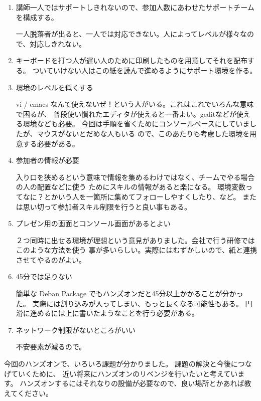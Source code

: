\documentclass[mingoth,a4paper]{jsarticle}
\begin{document}
 \begin{enumerate}
   \item 講師一人ではサポートしきれないので、参加人数にあわせたサポートチームを構成する。

     一人脱落者が出ると、一人では対応できない。人によってレベルが様々なので、対応しきれない。

   \item キーボードを打つ人が遅い人のために印刷したものを用意してそれを配布する。
         ついていけない人はこの紙を読んで進めるようにサポート環境を作る。

   \item  環境のレベルを低くする
    
     vi / emacs なんて使えないぜ！という人がいる。これはこれでいろんな意味で困るが、
     普段使い慣れたエディタが使えると一番よい。geditなどが使える環境なども必要。
     今回は手順を省くためにコンソールベースにしていましたが、マウスがないとだめな人もいる
     ので、このあたりも考慮した環境を用意する必要がある。

   \item 参加者の情報が必要

     入り口を狭めるという意味で情報を集めるわけではなく、チームでやる場合の人の配置などに使う
     ためにスキルの情報があると楽になる。
     環境変数ってなに？とかいう人を一箇所に集めてフォローしやすくしたり、など。
     または思い切って参加者スキル制限を行うと良い事もある。
    
   \item プレゼン用の画面とコンソール画面があるとよい

      ２つ同時に出せる環境が理想という意見がありました。会社で行う研修ではこのような方法を使う
      事が多いらしい。実際にはむずかしいので、紙と連携させてやるのがよい。

   \item 45分では足りない

      簡単な Deban Package でもハンズオンだと45分以上かかることが分かった。
      実際には割り込みが入ってしまい、もっと長くなる可能性もある。
      円滑に進めるには上に書いたようなことを行う必要がある。

   \item ネットワーク制限がないところがいい

      不安要素が減るので。 
     
  \end{enumerate}

 今回のハンズオンで、いろいろ課題が分かりました。
 課題の解決と今後につなげていくために、
 近い将来にハンズオンのリベンジを行いたいと考えています。
 ハンズオンするにはそれなりの設備が必要なので、良い場所とかあれば教えてください。
\end{document}
